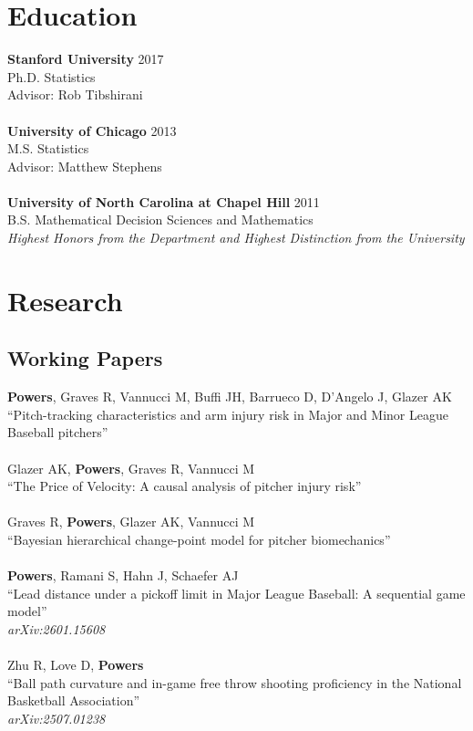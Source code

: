 \documentclass{article}
\begin{document}
\section*{\sc Education}

{\bf Stanford University} \hfill 2017\\
Ph.D. Statistics\\
Advisor: Rob Tibshirani\\
~\\
{\bf University of Chicago} \hfill 2013\\
M.S. Statistics\\
Advisor: Matthew Stephens\\
~\\
{\bf University of North Carolina at Chapel Hill} \hfill 2011\\
B.S. Mathematical Decision Sciences and Mathematics\\
{\it Highest Honors from the Department and Highest Distinction from the University}


\section*{\sc Research}

\subsection*{\sc Working Papers}

{\bf Powers}, Graves R, Vannucci M, Buffi JH, Barrueco D, D'Angelo J, Glazer AK\\
``Pitch-tracking characteristics and arm injury risk in Major and Minor League Baseball pitchers''\\
~\\
Glazer AK, {\bf Powers}, Graves R, Vannucci M\\
``The Price of Velocity: A causal analysis of pitcher injury risk''\\
~\\
Graves R, {\bf Powers}, Glazer AK, Vannucci M\\
``Bayesian hierarchical change-point model for pitcher biomechanics''\\
~\\
{\bf Powers}, Ramani S, Hahn J, Schaefer AJ\\
``Lead distance under a pickoff limit in Major League Baseball: A sequential game model''\\
{\it arXiv:2601.15608}\\
~\\
Zhu R, Love D, {\bf Powers}\\
``Ball path curvature and in-game free throw shooting proficiency in the National Basketball Association''\\
{\it arXiv:2507.01238}\\
\end{document}
